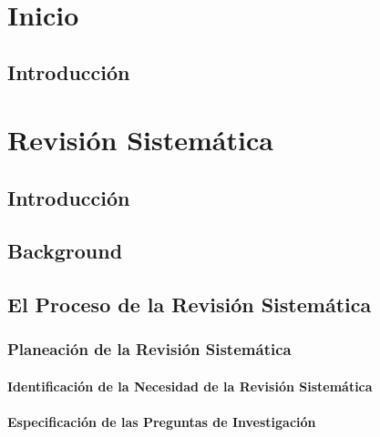 \documentclass{report}
\makeatletter
\let\thedate\@date
\makeatother
\begin{document}
\begin{titlepage}
	{\large \thedate}\\[2 cm]
 
	\vfill
	
\end{titlepage}


\tableofcontents
\pagebreak

\chapter{Inicio}
    
    \section{Introducción}


\chapter{Revisión Sistemática}

    \section{Introducción}
    
    \section{Background}
    
    \section{El Proceso de la Revisión Sistemática}
    

        \subsection{Planeación de la Revisión Sistemática}
    
    	    \subsubsection{Identificación de la Necesidad de la Revisión Sistemática} \label{needs}
    	    
	
    	    \subsubsection{Especificación de las Preguntas de Investigación}
            
\end{document}
